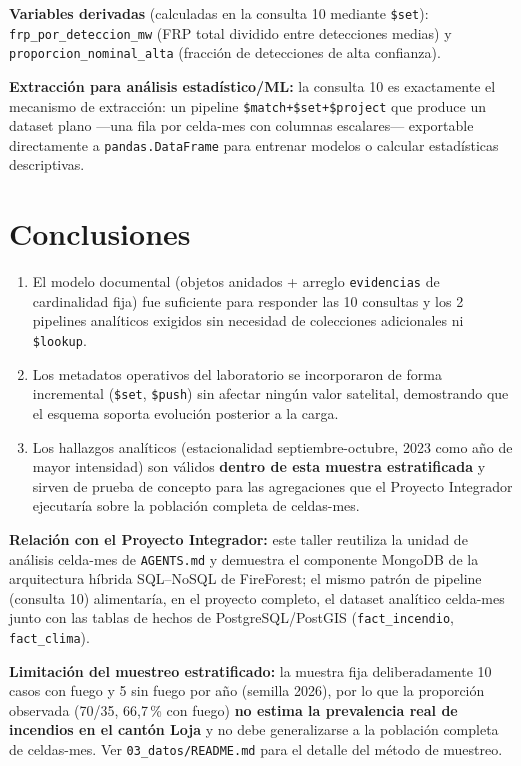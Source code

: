 \documentclass[11pt]{article}
\begin{document}
\textbf{Variables derivadas} (calculadas en la consulta 10 mediante
\lstinline!$set!): \lstinline!frp_por_deteccion_mw! (FRP total dividido
entre detecciones medias) y \lstinline!proporcion_nominal_alta! (fracción de
detecciones de alta confianza).

\textbf{Extracción para análisis estadístico/ML:} la consulta 10 es
exactamente el mecanismo de extracción: un pipeline
\lstinline!$match+$set+$project! que produce un dataset plano —una fila por
celda-mes con columnas escalares— exportable directamente a
\texttt{pandas.DataFrame} para entrenar modelos o calcular estadísticas
descriptivas.

\section{Conclusiones}

\begin{enumerate}[itemsep=1pt]
  \item El modelo documental (objetos anidados + arreglo \texttt{evidencias}
  de cardinalidad fija) fue suficiente para responder las 10 consultas y
  los 2 pipelines analíticos exigidos sin necesidad de colecciones
  adicionales ni \lstinline!$lookup!.
  \item Los metadatos operativos del laboratorio se incorporaron de forma
  incremental (\lstinline!$set!, \lstinline!$push!) sin afectar ningún valor
  satelital, demostrando que el esquema soporta evolución posterior a la
  carga.
  \item Los hallazgos analíticos (estacionalidad septiembre-octubre, 2023
  como año de mayor intensidad) son válidos \textbf{dentro de esta muestra
  estratificada} y sirven de prueba de concepto para las agregaciones que
  el Proyecto Integrador ejecutaría sobre la población completa de
  celdas-mes.
\end{enumerate}

\textbf{Relación con el Proyecto Integrador:} este taller reutiliza la
unidad de análisis celda-mes de \texttt{AGENTS.md} y demuestra el componente
MongoDB de la arquitectura híbrida SQL--NoSQL de FireForest; el mismo
patrón de pipeline (consulta 10) alimentaría, en el proyecto completo, el
dataset analítico celda-mes junto con las tablas de hechos de
PostgreSQL/PostGIS (\texttt{fact\_incendio}, \texttt{fact\_clima}).

\textbf{Limitación del muestreo estratificado:} la muestra fija
deliberadamente 10 casos con fuego y 5 sin fuego por año (semilla 2026), por
lo que la proporción observada (70/35, 66,7\,\% con fuego) \textbf{no estima
la prevalencia real de incendios en el cantón Loja} y no debe generalizarse
a la población completa de celdas-mes. Ver
\texttt{03\_datos/README.md} para el detalle del método de muestreo.
\end{document}
